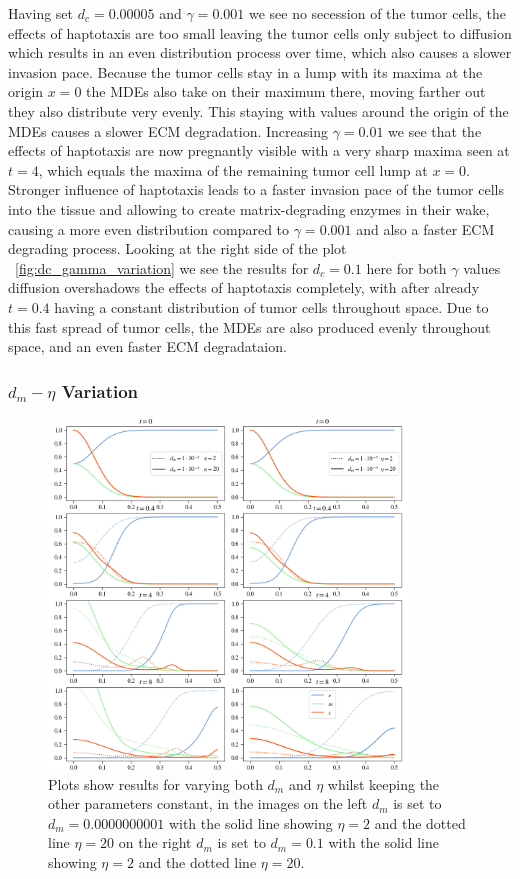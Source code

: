 Having set $d_c=0.00005$ and $\gamma=0.001$ we see no secession of the tumor cells, the effects of haptotaxis are too small leaving the tumor cells only subject to diffusion which results in an even distribution process over time, which also causes a slower invasion pace. Because the tumor cells stay in a lump with its maxima at the origin $x=0$ the MDEs also take on their maximum there, moving farther out they also distribute very evenly. This staying with values around the origin of the MDEs causes a slower ECM degradation. Increasing $\gamma=0.01$ we see that the effects of haptotaxis are now pregnantly visible with a very sharp maxima seen at $t=4$, which equals the maxima of the remaining tumor cell lump at $x=0$. Stronger influence of haptotaxis leads to a faster invasion pace of the tumor cells into the tissue and allowing to create matrix-degrading enzymes in their wake, causing a more even distribution compared to $\gamma=0.001$ and also a faster ECM degrading process. 
Looking at the right side of the plot ~\ref{fig:dc_gamma_variation} we see the results for $d_c=0.1$ here for both $\gamma$ values diffusion overshadows the effects of haptotaxis completely, with after already $t=0.4$ having a constant distribution of tumor cells throughout space. Due to this fast spread of tumor cells, the MDEs are also produced evenly throughout space, and an even faster ECM degradataion. 

\subsubsection*{$d_m - \eta$ Variation}
\begin{figure}[h]
    \centering
    \includegraphics[width=0.85\textwidth]{resources/images/dm_eta_variation.png}
    \caption{Plots show results for varying both $d_m$ and $\eta$ whilst keeping the other parameters constant, in the images on the left $d_m$ is set to $d_m=0.0000000001$ with the solid line showing $\eta = 2$ and the dotted line $\eta=20$ on the right $d_m$ is set to $d_m=0.1$ with the solid line showing $\eta = 2$ and the dotted line $\eta=20$.}
    \label{fig:dm_eta_variation}
\end{figure}

